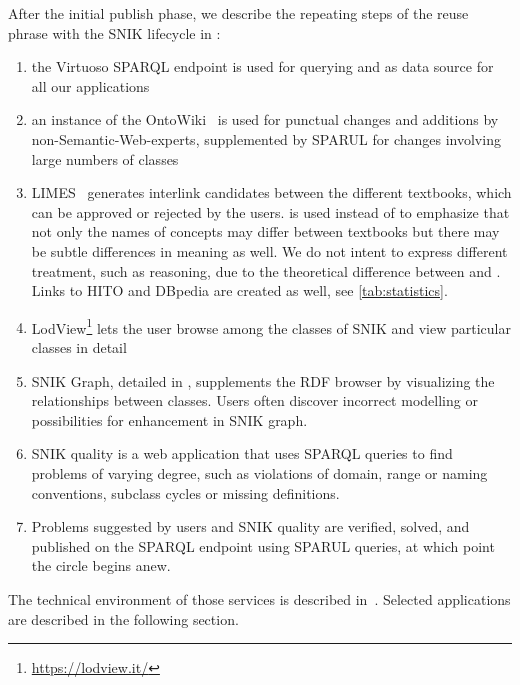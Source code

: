 \documentclass[conference]{IEEEtran}
\newcommand{\citet}{\cite}%
\newcommand{\citep}{\cite}%
\begin{document}
After the initial publish phase, we describe the repeating steps of the reuse phrase with the SNIK lifecycle in :
\begin{enumerate}
\item the Virtuoso SPARQL endpoint is used for querying and as data source for all our applications  
\item an instance of the OntoWiki~\citep{ontowiki} is used for punctual changes and additions by non-Semantic-Web-experts, supplemented by SPARUL for changes involving large numbers of classes 
\item LIMES~\citep{limes} generates interlink candidates between the different textbooks, which can be approved or rejected by the users.
 is used instead of  to emphasize that not only the names of concepts may differ between textbooks but there may be subtle differences in meaning as well.
We do not intent to express different treatment, such as reasoning, due to the theoretical difference between  and .
Links to HITO and DBpedia are created as well, see \cref{tab:statistics}.
\item LodView\footnote{\url{https://lodview.it/}} lets the user browse among the classes of SNIK and view particular classes in detail
\item SNIK Graph, detailed in , supplements the RDF browser by visualizing the relationships between classes.
Users often discover incorrect modelling or possibilities for enhancement in SNIK graph.
\item SNIK quality is a web application that uses SPARQL queries to find problems of varying degree, such as violations of domain, range or naming conventions, subclass cycles or missing definitions.
\item Problems suggested by users and SNIK quality are verified, solved, and published on the SPARQL endpoint using SPARUL queries, at which point the circle begins anew.
\end{enumerate}

The technical environment of those services is described in~\citet{sniktec}.
Selected applications are described in the following section.
\end{document}
